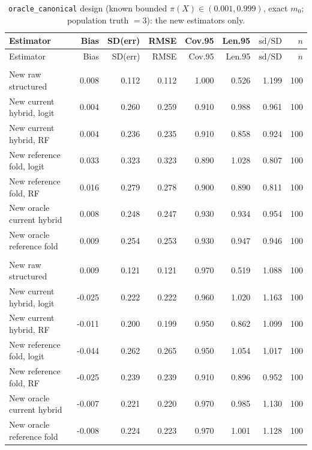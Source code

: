 {\footnotesize
\begin{longtable}{lrrrrrrr}
\caption{\texttt{oracle\_canonical} design (known bounded $\pi(X)\in(0.001,0.999)$, exact $m_0$; population truth $=3$): the new estimators only.}\label{tab:oracle}\\
\toprule
Estimator & Bias & SD(err) & RMSE & Cov.95 & Len.95 & $\overline{\mathrm{sd}}/\mathrm{SD}$ & $n$ \\
\midrule

\endfirsthead
\toprule
Estimator & Bias & SD(err) & RMSE & Cov.95 & Len.95 & $\overline{\mathrm{sd}}/\mathrm{SD}$ & $n$ \\
\midrule

\endhead
\bottomrule
\endlastfoot
\multicolumn{8}{l}{\textit{$N=200$, degree $d=1$}} \\
\quad New raw structured & 0.008 & 0.112 & 0.112 & 1.000 & 0.526 & 1.199 & 100 \\
\quad New current hybrid, logit & 0.004 & 0.260 & 0.259 & 0.910 & 0.988 & 0.961 & 100 \\
\quad New current hybrid, RF & 0.004 & 0.236 & 0.235 & 0.910 & 0.858 & 0.924 & 100 \\
\quad New reference fold, logit & 0.033 & 0.323 & 0.323 & 0.890 & 1.028 & 0.807 & 100 \\
\quad New reference fold, RF & 0.016 & 0.279 & 0.278 & 0.900 & 0.890 & 0.811 & 100 \\
\quad New oracle current hybrid & 0.008 & 0.248 & 0.247 & 0.930 & 0.934 & 0.954 & 100 \\
\quad New oracle reference fold & 0.009 & 0.254 & 0.253 & 0.930 & 0.947 & 0.946 & 100 \\
\addlinespace
\multicolumn{8}{l}{\textit{$N=200$, degree $d=2$}} \\
\quad New raw structured & 0.009 & 0.121 & 0.121 & 0.970 & 0.519 & 1.088 & 100 \\
\quad New current hybrid, logit & -0.025 & 0.222 & 0.222 & 0.960 & 1.020 & 1.163 & 100 \\
\quad New current hybrid, RF & -0.011 & 0.200 & 0.199 & 0.950 & 0.862 & 1.099 & 100 \\
\quad New reference fold, logit & -0.044 & 0.262 & 0.265 & 0.950 & 1.054 & 1.017 & 100 \\
\quad New reference fold, RF & -0.025 & 0.239 & 0.239 & 0.910 & 0.896 & 0.952 & 100 \\
\quad New oracle current hybrid & -0.007 & 0.221 & 0.220 & 0.970 & 0.985 & 1.130 & 100 \\
\quad New oracle reference fold & -0.008 & 0.224 & 0.223 & 0.970 & 1.001 & 1.128 & 100 \\

\end{longtable}}
